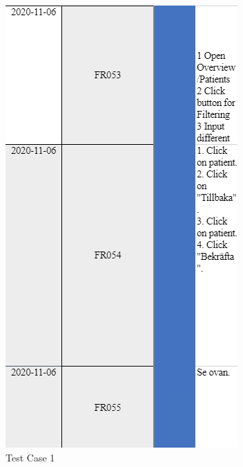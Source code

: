 \begin{figure}[ht!]
\begin{minipage}[t]{0.5\textwidth}
    \centering
    \includegraphics[scale=0.75]{Pictures/TestCase1.PNG}
    \caption{Test Case 1}
\end{minipage}%
\begin{minipage}[t]{0.5\textwidth}
    \centering

\end{minipage}
\end{figure}
